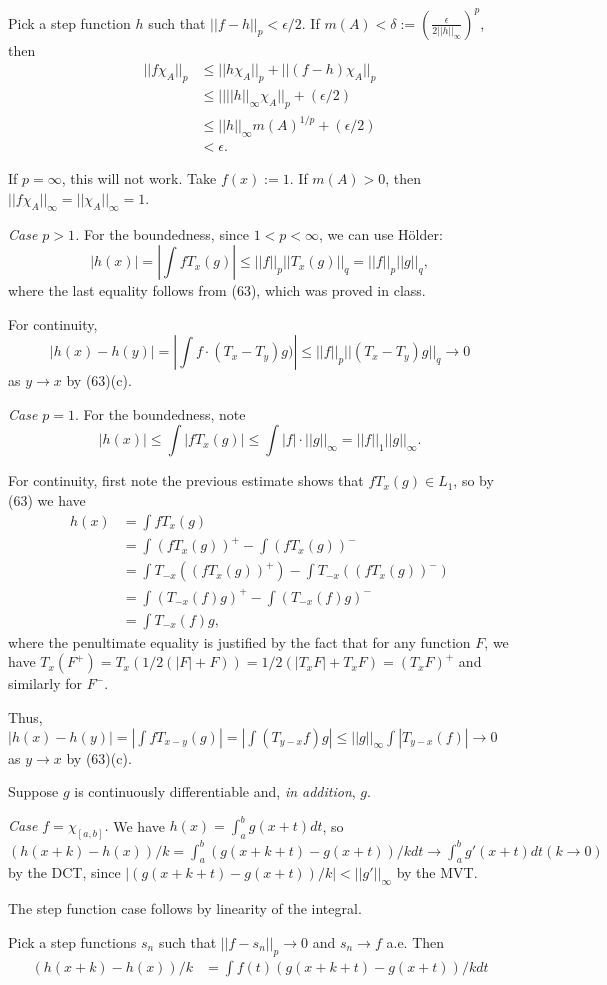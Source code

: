 \documentclass{article}
\begin{document}
Pick a step function $h$ such that $||f - h||_p < \epsilon/2$. If $m(A) < \delta := (\frac \epsilon {2 ||h||_\infty})^p$, then
\begin{align*}
||f \chi_A||_p & \le ||h \chi_A||_p + ||(f-h) \chi_A||_p
\\ & \le || ||h||_\infty \chi_A||_p + (\epsilon/2)
\\ & \le ||h||_\infty m(A)^{1/p} + (\epsilon/2)
\\ & < \epsilon.
\end{align*}

If $p = \infty$, this will not work.  Take $f(x) := 1$. If $m(A) >0$, then $||f\chi_A||_\infty = ||\chi_A||_\infty = 1$.

 \emph{Case $p>1$.} For the boundedness, since $1<p<\infty$, we can use H\"{o}lder:
$$|h(x)| = |\int f T_x(g)| \le ||f||_p||T_x(g)||_q = ||f||_p||g||_q,$$
where the last equality follows from (63), which was proved in class.

For continuity,
$$|h(x) - h(y)| = |\int f \cdot (T_x - T_y)g)| \le ||f||_p||(T_x - T_y)g||_q \to 0$$
as $y\to x$ by (63)(c).

\emph{Case $p=1$}. For the boundedness, note 
$$|h(x)| \le \int |f T_x(g)| \le \int |f| \cdot ||g||_\infty = ||f||_1||g||_\infty.$$

For continuity, first note the previous estimate shows that $f T_x(g) \in L_1$, so by (63) we have
\begin{align*}
h(x) & = \int f T_x (g) 
\\ & = \int (f T_x (g))^+ - \int (f T_x (g))^-
\\ & = \int T_{-x} ((f T_x (g))^+) - \int T_{-x} ((f T_x (g))^-)
\\ & = \int (T_{-x}(f) g)^+ - \int (T_{-x} (f) g)^-
\\ & = \int T_{-x}(f) g,
\end{align*}
where the penultimate equality is justified by the fact that for any function $F$, we have $T_x(F^+) = T_x(1/2(|F| + F)) = 1/2(|T_xF| + T_xF) = (T_xF)^+$ and similarly for $F^-$.

Thus, $|h(x) - h(y)| = |\int f T_{x-y}(g)| = |\int (T_{y-x}f) g| \le ||g||_\infty \int |T_{y-x}(f)|  \to 0$
as $y\to x$ by (63)(c).

Suppose $g$ is continuously differentiable and, \emph{in addition}, $g$.

\emph{Case $f = \chi_{[a,b]}$.}  We have $h(x) = \int_a^b g(x+t) dt$, so
 $(h(x + k) - h(x))/k = \int_a^b (g(x +k + t) - g(x + t))/k dt
  \to \int_a^b g'(x + t) dt  (k \to 0)$
 by the DCT, since $|(g(x +k + t) - g(x + t))/k| < ||g'||_\infty$ by the MVT.

The step function case follows by linearity of the integral.

Pick a step functions $s_n$ such that $||f-s_n||_p \to 0$ and $s_n \to f$ a.e.
Then 
\begin{align*}
(h(x + k) - h(x))/k & = \int f(t)(g(x +k + t) - g(x + t))/k dt
\\ &
\end{align*}
\end{document}
